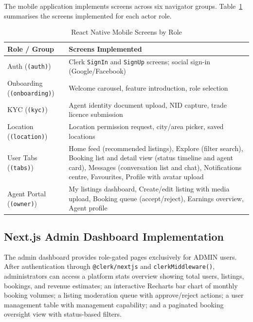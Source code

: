 \documentclass[12pt,a4paper]{report}
\begin{document}
The mobile application implements screens across six navigator groups.
Table~\ref{tab:mobile} summarises the screens implemented for each actor role.

\begin{table}[H]
\caption{React Native Mobile Screens by Role}
\label{tab:mobile}
\centering
\small
{}
\begin{tabularx}{\textwidth}{|l|X|}
\hline
\textbf{Role / Group} & \textbf{Screens Implemented} \\
\hline
Auth (\texttt{(auth)}) & Clerk \texttt{SignIn} and \texttt{SignUp} screens; social sign-in (Google/Facebook) \\
\hline
Onboarding (\texttt{(onboarding)}) & Welcome carousel, feature introduction, role selection \\
\hline
KYC (\texttt{(kyc)}) & Agent identity document upload, NID capture, trade licence submission \\
\hline
Location (\texttt{(location)}) & Location permission request, city/area picker, saved locations \\
\hline
User Tabs (\texttt{(tabs)}) & Home feed (recommended listings), Explore (filter search), Booking list and detail view (status timeline and agent card), Messages (conversation list and chat), Notifications centre, Favourites, Profile with avatar upload \\
\hline
Agent Portal (\texttt{(owner)}) & My listings dashboard, Create/edit listing with media upload, Booking queue (accept/reject), Earnings overview, Agent profile \\
\hline
\end{tabularx}
\end{table}

\subsection{Next.js Admin Dashboard Implementation}

The admin dashboard provides role-gated pages exclusively for ADMIN users. After
authentication through \texttt{@clerk/nextjs} and \texttt{clerkMiddleware()},
administrators can access a platform stats overview showing total users, listings,
bookings, and revenue estimates; an interactive Recharts bar chart of monthly booking
volumes; a listing moderation queue with approve/reject actions; a user management table
with management capability; and a paginated booking oversight view with status-based
filters.
\end{document}
